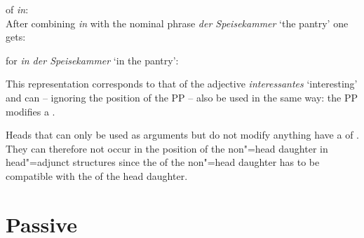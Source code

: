 \ea
\catv of \emph{in}:\\
\z
After combining \emph{in} with the nominal phrase \emph{der Speisekammer} `the pantry' one gets:

\eas
\catv for \emph{in der Speisekammer} `in the pantry':\\
\zs

\noindent
This representation corresponds to that of the adjective \emph{interessantes} `interesting' and can -- ignoring the position of the PP -- also be used in the same way:
the PP modifies a \nbar.

Heads that can only be used as arguments but do not modify anything have a \modv of .
They can therefore not occur in the position of the non"=head daughter in head"=adjunct structures since the \modv of the non"=head daughter has to be compatible
with the \synsemv of the head daughter.

\section{Passive}
\label{Abschnitt-HPSG-Passiv}\label{sec-hpsg-passive}

